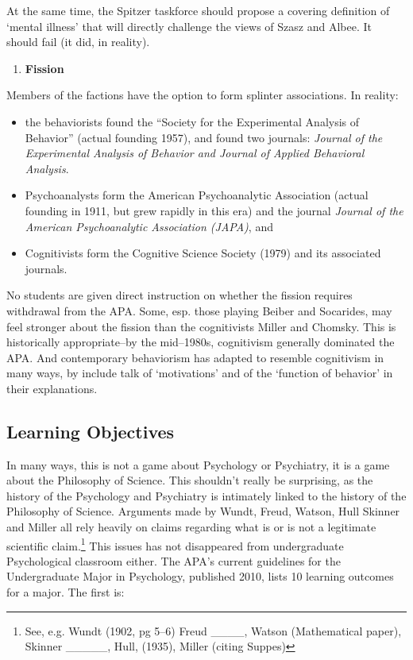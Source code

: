 \begin{refsection}
At the same time, the Spitzer taskforce should propose a covering definition of `mental illness' that will directly challenge the views of Szasz and Albee. It should fail (it did, in reality). 

\begin{enumerate}
\item \textbf{Fission}

\end{enumerate}

Members of the factions have the option to form splinter associations. In reality:

\begin{itemize}
\item the behaviorists found the ``Society for the Experimental Analysis of Behavior'' (actual founding 1957), and found two journals: \emph{Journal of the Experimental Analysis of Behavior and Journal of Applied Behavioral Analysis}. 

\item Psychoanalysts form the American Psychoanalytic Association (actual founding in 1911, but grew rapidly in this era) and the journal \emph{Journal of the American Psychoanalytic Association (JAPA)}, and 

\item Cognitivists form the Cognitive Science Society (1979) and its associated journals. 

\end{itemize}

No students are given direct instruction on whether the fission requires withdrawal from the APA. Some, esp. those playing Beiber and Socarides, may feel stronger about the fission than the cognitivists Miller and Chomsky. This is historically appropriate–by the mid--1980s, cognitivism generally dominated the APA. And contemporary behaviorism has adapted to resemble cognitivism in many ways, by include talk of `motivations' and of the `function of behavior' in their explanations.

\newpage

\subsection{Learning Objectives}
\label{learningobjectives}

In many ways, this is not a game about Psychology or Psychiatry, it is a game about the Philosophy of Science. This shouldn't really be surprising, as the history of the Psychology and Psychiatry is intimately linked to the history of the Philosophy of Science. Arguments made by Wundt, Freud, Watson, Hull Skinner and Miller all rely heavily on claims regarding what is or is not a legitimate scientific claim.\footnote{See, e.g. Wundt (1902, pg 5--6) Freud \_\_\_\_, Watson (Mathematical paper), Skinner \_\_\_\_\_, Hull, (1935), Miller (citing Suppes)} This issues has not disappeared from undergraduate Psychological classroom either. The APA's current guidelines for the Undergraduate Major in Psychology, published 2010, lists 10 learning outcomes for a major. The first is:


\end{refsection}
